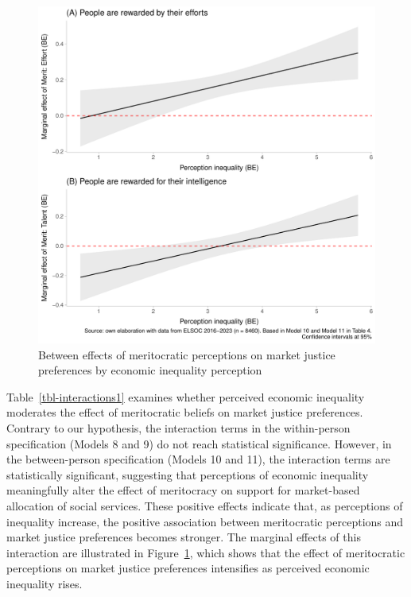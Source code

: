 \documentclass[
  12pt,
]{article}
\begin{document}
\begin{figure}[H]

{\centering \includegraphics[width=1\textwidth,height=\textheight]{figure4.pdf}

}

\caption{\label{figure4}Between effects of meritocratic perceptions
on market justice preferences by economic inequality perception}

\end{figure}

Table~\ref{tbl-interactions1} examines whether perceived economic
inequality moderates the effect of meritocratic beliefs on market
justice preferences. Contrary to our hypothesis, the interaction terms
in the within-person specification (Models 8 and 9) do not reach
statistical significance. However, in the between-person specification
(Models 10 and 11), the interaction terms are statistically significant,
suggesting that perceptions of economic inequality meaningfully alter
the effect of meritocracy on support for market-based allocation of
social services. These positive effects indicate that, as perceptions of
inequality increase, the positive association between meritocratic
perceptions and market justice preferences becomes stronger. The
marginal effects of this interaction are illustrated in
Figure~\ref{figure4}, which shows that the effect of meritocratic
perceptions on market justice preferences intensifies as perceived
economic inequality rises.
\end{document}
